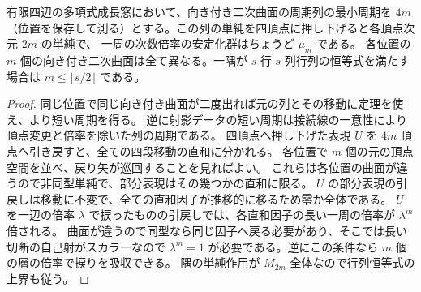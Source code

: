 \begin{corollary}\label{cor:quadrics-period-fold-simple}
有限四辺の多項式成長窓において、向き付き二次曲面の周期列の最小周期を $4m$
（位置を保存して測る）とする。この列の単純を四頂点に押し下げると各頂点次元 $2m$ の単純で、
一周の次数倍率の安定化群はちょうど $\mu_m$ である。
各位置の $m$ 個の向き付き二次曲面は全て異なる。一隅が $s$ 行 $s$ 列行列の恒等式を満たす場合は
$m\le\lfloor s/2\rfloor$ である。
\end{corollary}
\begin{proof}
同じ位置で同じ向き付き曲面が二度出れば元の列とその移動に定理を使え、より短い周期を得る。
逆に射影データの短い周期は接続線の一意性により頂点変更と倍率を除いた列の周期である。
四頂点へ押し下げた表現 $U$ を $4m$ 頂点へ引き戻すと、全ての四段移動の直和に分かれる。
各位置で $m$ 個の元の頂点空間を並べ、戻り矢が巡回することを見ればよい。
これらは各位置の曲面が違うので非同型単純で、部分表現はその幾つかの直和に限る。
$U$ の部分表現の引戻しは移動に不変で、全ての直和因子が推移的に移るため零か全体である。
$U$ を一辺の倍率 $\lambda$ で捩ったものの引戻しでは、各直和因子の長い一周の倍率が $\lambda^m$ 倍される。
曲面が違うので同型なら同じ因子へ戻る必要があり、そこでは長い切断の自己射がスカラーなので
$\lambda^m=1$ が必要である。逆にこの条件なら $m$ 個の層の倍率で捩りを吸収できる。
隅の単純作用が $M_{2m}$ 全体なので行列恒等式の上界も従う。
\end{proof}
